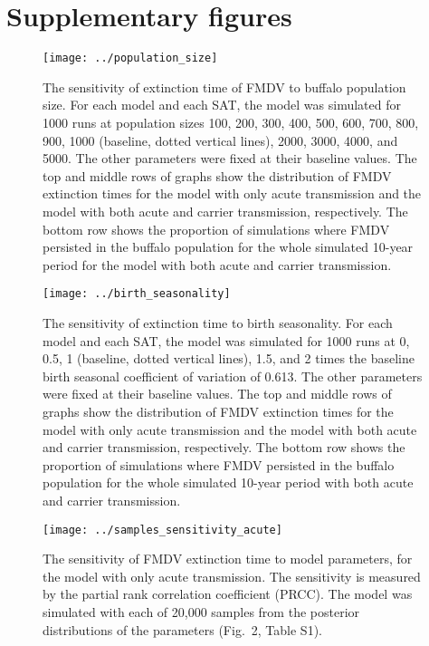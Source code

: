 \documentclass[12pt, USenglish]{article}  %
\begin{document}
\section*{Supplementary figures}

\begin{figure}[h!]
  \centering
  \texttt{[image: ../population\_size]}
  \caption{The sensitivity of extinction time of FMDV to buffalo
    population size.
    For each model and each SAT, the model was simulated for 1000 runs
    at population sizes 100, 200, 300, 400, 500, 600, 700, 800, 900,
    1000 (baseline, dotted vertical lines), 2000, 3000, 4000, and
    5000.
    The other parameters were fixed at their baseline values.
    The top and middle rows of graphs show the distribution of
    FMDV extinction times for the model with only acute transmission
    and the model with both acute and carrier transmission,
    respectively.
    The bottom row shows the proportion of simulations where FMDV
    persisted in the buffalo population for the whole simulated
    10-year period for the model with both acute and carrier
    transmission.}
\end{figure}


\begin{figure}
  \centering
  \texttt{[image: ../birth\_seasonality]}
  \caption{The sensitivity of extinction time to birth seasonality.
    For each model and each SAT, the model was simulated for
    1000 runs at 0, 0.5, 1 (baseline, dotted vertical lines), 1.5, and
    2 times the baseline birth seasonal coefficient of variation of
    0.613.
    The other parameters were fixed at their baseline values.
    The top and middle rows of graphs show the distribution of
    FMDV extinction times for the model with only acute transmission
    and the model with both acute and carrier transmission,
    respectively.
    The bottom row shows the proportion of simulations where FMDV
    persisted in the buffalo population for the whole simulated
    10-year period with both acute and carrier transmission.}
\end{figure}


\begin{figure}
  \centering
  \texttt{[image: ../samples\_sensitivity\_acute]}
  \caption{The sensitivity of FMDV extinction time to model
    parameters, for the model with only acute transmission.
    The sensitivity is measured by the partial rank correlation
    coefficient (PRCC). The model was simulated with each of 20,000
    samples from the posterior distributions of the parameters
    (Fig.~2, Table S1).}
\end{figure}
\end{document}
